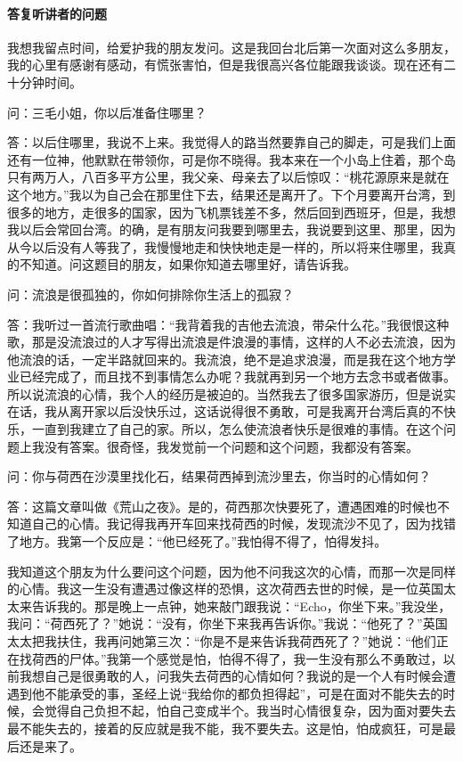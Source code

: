 \paragraph*{答复听讲者的问题}
\par 我想我留点时间，给爱护我的朋友发问。这是我回台北后第一次面对这么多朋友，我的心里有感谢有感动，有慌张害怕，但是我很高兴各位能跟我谈谈。现在还有二十分钟时间。
\par 问：三毛小姐，你以后准备住哪里？
\par 答：以后住哪里，我说不上来。我觉得人的路当然要靠自己的脚走，可是我们上面还有一位神，他默默在带领你，可是你不晓得。我本来在一个小岛上住着，那个岛只有两万人，八百多平方公里，我父亲、母亲去了以后惊叹：“桃花源原来是就在这个地方。”我以为自己会在那里住下去，结果还是离开了。下个月要离开台湾，到很多的地方，走很多的国家，因为飞机票钱差不多，然后回到西班牙，但是，我想我以后会常回台湾。的确，是有朋友问我要到哪里去，我说要到这里、那里，因为从今以后没有人等我了，我慢慢地走和快快地走是一样的，所以将来住哪里，我真的不知道。问这题目的朋友，如果你知道去哪里好，请告诉我。
\par 问：流浪是很孤独的，你如何排除你生活上的孤寂？
\par 答：我听过一首流行歌曲唱：“我背着我的吉他去流浪，带朵什么花。”我很恨这种歌，那是没流浪过的人才写得出流浪是件浪漫的事情，这样的人不必去流浪，因为他流浪的话，一定半路就回来的。我流浪，绝不是追求浪漫，而是我在这个地方学业已经完成了，而且找不到事情怎么办呢？我就再到另一个地方去念书或者做事。所以说流浪的心情，我个人的经历是被迫的。当然我去了很多国家游历，但是说实在话，我从离开家以后没快乐过，这话说得很不勇敢，可是我离开台湾后真的不快乐，一直到我建立了自己的家。所以，怎么使流浪者快乐是很难的事情。在这个问题上我没有答案。很奇怪，我发觉前一个问题和这个问题，我都没有答案。
\par 问：你与荷西在沙漠里找化石，结果荷西掉到流沙里去，你当时的心情如何？
\par 答：这篇文章叫做《荒山之夜》。是的，荷西那次快要死了，遭遇困难的时候也不知道自己的心情。我记得我再开车回来找荷西的时候，发现流沙不见了，因为找错了地方。我第一个反应是：“他已经死了。”我怕得不得了，怕得发抖。
\par 我知道这个朋友为什么要问这个问题，因为他不问我这次的心情，而那一次是同样的心情。我这一生没有遭遇过像这样的恐惧，这次荷西去世的时候，是一位英国太太来告诉我的。那是晚上一点钟，她来敲门跟我说：“Echo，你坐下来。”我没坐，我问：“荷西死了？”她说：“没有，你坐下来我再告诉你。”我说：“他死了？”英国太太把我扶住，我再问她第三次：“你是不是来告诉我荷西死了？”她说：“他们正在找荷西的尸体。”我第一个感觉是怕，怕得不得了，我一生没有那么不勇敢过，以前我想自己是很勇敢的人，问我失去荷西的心情如何？我说的是一个人有时候会遭遇到他不能承受的事，圣经上说“我给你的都负担得起”，可是在面对不能失去的时候，会觉得自己负担不起，怕自己变成半个。我当时心情很复杂，因为面对要失去最不能失去的，接着的反应就是我不能，我不要失去。这是怕，怕成疯狂，可是最后还是来了。
